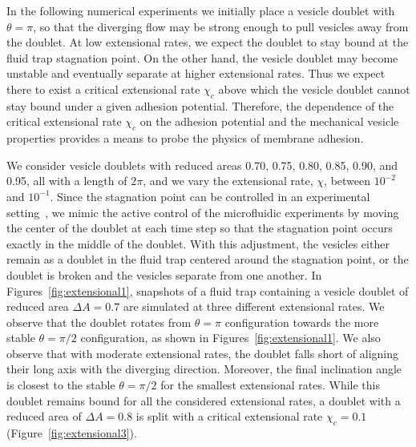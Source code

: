 \documentclass[prf,superscriptaddress,showkeys]{revtex4-1}
\begin{document}
In the following numerical experiments we initially place a vesicle
doublet with $\theta=\pi$, so that the diverging flow may be strong
enough to pull vesicles away from the doublet.  At low extensional
rates, we expect the doublet to stay bound at the fluid trap stagnation
point.  On the other hand, the vesicle doublet may become unstable and
eventually separate at higher extensional rates.  Thus we expect there
to exist a critical extensional rate $\chi_c$ above which the vesicle
doublet cannot stay bound under a given adhesion potential.  Therefore,
the dependence of the critical extensional rate $\chi_c$ on the adhesion
potential and the mechanical vesicle properties provides a means to
probe the physics of membrane adhesion.


We consider vesicle doublets with reduced areas 0.70, 0.75, 0.80, 0.85,
0.90, and 0.95, all with a length of $2\pi$, and we vary the extensional
rate, $\chi$, between $10^{-2}$ and $10^{-1}$.  Since the stagnation
point can be controlled in an experimental
setting~\cite{Johnson-Chavarria2011_EMJ}, we mimic the active control of
the microfluidic experiments by moving the center of the doublet at each
time step so that the stagnation point occurs exactly in the middle of
the doublet.  With this adjustment, the vesicles either remain as a
doublet in the fluid trap centered around the stagnation point, or the
doublet is broken and the vesicles separate from one another.  In
Figures~\ref{fig:extensional1}, snapshots of a fluid trap containing a
vesicle doublet of reduced area $\Delta A = 0.7$ are simulated at three
different extensional rates.  We observe that the doublet rotates from
$\theta=\pi$ configuration towards the more stable $\theta=\pi/2$
configuration, as shown in Figures~\ref{fig:extensional1}.  We also
observe that with moderate extensional rates, the doublet falls short of
aligning their long axis with the diverging direction.  Moreover, the
final inclination angle is closest to the stable $\theta=\pi/2$ for the
smallest extensional rates.  While this doublet remains bound for all
the considered extensional rates, a doublet with a reduced area of
$\Delta A = 0.8$ is split with a critical extensional rate $\chi_c =
0.1$ (Figure~\ref{fig:extensional3}).  
\end{document}
